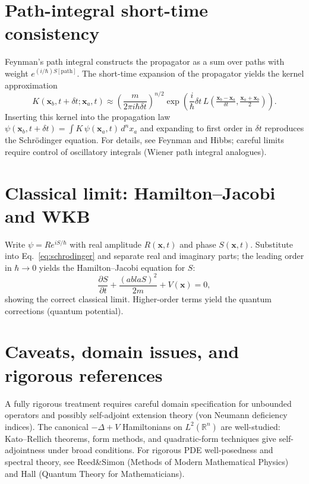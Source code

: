 \documentclass[11pt]{article}
\begin{document}
\section{Path-integral short-time consistency}
Feynman's path integral constructs the propagator as a sum over paths with weight $e^{(i/\hbar)S[\text{path}]}$.  The short-time expansion of the propagator yields the kernel approximation
\begin{equation}
K(\mathbf{x}_b,t+\delta t;\mathbf{x}_a,t)\approx\left(\frac{m}{2\pi i\hbar\delta t}\right)^{n/2}\exp\left(\frac{i}{\hbar}\delta t\,L\left(\tfrac{\mathbf{x}_b-\mathbf{x}_a}{\delta t},\tfrac{\mathbf{x}_a+\mathbf{x}_b}{2}\right)\right).
\end{equation}
Inserting this kernel into the propagation law $\psi(\mathbf{x}_b,t+\delta t)=\int K\,\psi(\mathbf{x}_a,t)\,d^n x_a$ and expanding to first order in $\delta t$ reproduces the Schr\"odinger equation.  For details, see Feynman and Hibbs; careful limits require control of oscillatory integrals (Wiener path integral analogues).

\section{Classical limit: Hamilton--Jacobi and WKB}
Write $\psi=R e^{iS/\hbar}$ with real amplitude $R(\mathbf{x},t)$ and phase $S(\mathbf{x},t)$.  Substitute into Eq.~\eqref{eq:schrodinger} and separate real and imaginary parts; the leading order in $\hbar\to0$ yields the Hamilton--Jacobi equation for $S$:
\begin{equation}
\frac{\partial S}{\partial t}+\frac{(
abla S)^2}{2m}+V(\mathbf{x})=0,
\end{equation}
showing the correct classical limit.  Higher-order terms yield the quantum corrections (quantum potential).

\section{Caveats, domain issues, and rigorous references}
A fully rigorous treatment requires careful domain specification for unbounded operators and possibly self-adjoint extension theory (von Neumann deficiency indices).  The canonical $-\Delta+V$ Hamiltonians on $L^2(\mathbb{R}^n)$ are well-studied: Kato--Rellich theorems, form methods, and quadratic-form techniques give self-adjointness under broad conditions.  For rigorous PDE well-posedness and spectral theory, see Reed\&Simon (Methods of Modern Mathematical Physics) and Hall (Quantum Theory for Mathematicians).
\end{document}
